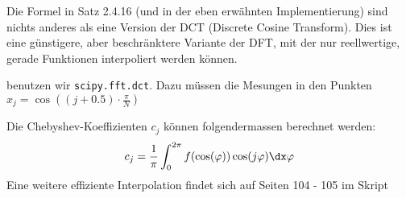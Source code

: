 \inlineremark Die Formel in Satz 2.4.16 (und in der eben erwähnten Implementierung) sind nichts anderes als eine Version der DCT (Discrete Cosine Transform).
Dies ist eine günstigere, aber beschränktere Variante der DFT, mit der nur reellwertige, gerade Funktionen interpoliert werden können.

 benutzen wir \texttt{scipy.fft.dct}. Dazu müssen die Mesungen in den Punkten $x_j = \cos\left( (j + 0.5) \cdot \frac{\pi}{N} \right)$

\inlineremark Die Chebyshev-Koeffizienten $c_j$ können folgendermassen berechnet werden:
\rmvspace
\begin{align*}
    c_j = \frac{1}{\pi} \int_{0}^{2\pi} f(\cos(\varphi)) \cos(j \varphi) \dx \varphi
\end{align*}
Eine weitere effiziente Interpolation findet sich auf Seiten 104 - 105 im Skript
